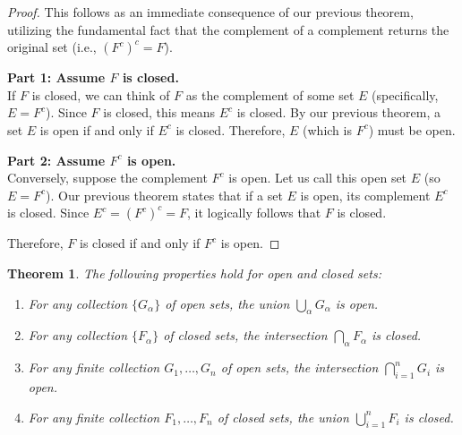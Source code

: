 \documentclass{article}
\theoremstyle{mythm}
\newtheorem{theorem}{Theorem}[section]
\begin{document}
\begin{proof}
This follows as an immediate consequence of our previous theorem, utilizing the fundamental fact that the complement of a complement returns the original set (i.e., $(F^c)^c = F$).

\textbf{Part 1: Assume $F$ is closed.} \\
If $F$ is closed, we can think of $F$ as the complement of some set $E$ (specifically, $E = F^c$). Since $F$ is closed, this means $E^c$ is closed. By our previous theorem, a set $E$ is open if and only if $E^c$ is closed. Therefore, $E$ (which is $F^c$) must be open.

\textbf{Part 2: Assume $F^c$ is open.} \\
Conversely, suppose the complement $F^c$ is open. Let us call this open set $E$ (so $E = F^c$). Our previous theorem states that if a set $E$ is open, its complement $E^c$ is closed. Since $E^c = (F^c)^c = F$, it logically follows that $F$ is closed.

Therefore, $F$ is closed if and only if $F^c$ is open.
\end{proof}
\begin{theorem}
The following properties hold for open and closed sets:
\begin{enumerate}[label=(\alph*)]
    \item For any collection $\{G_\alpha\}$ of open sets, the union $\bigcup_\alpha G_\alpha$ is open.
    \item For any collection $\{F_\alpha\}$ of closed sets, the intersection $\bigcap_\alpha F_\alpha$ is closed.
    \item For any finite collection $G_1, \dots, G_n$ of open sets, the intersection $\bigcap_{i=1}^n G_i$ is open.
    \item For any finite collection $F_1, \dots, F_n$ of closed sets, the union $\bigcup_{i=1}^n F_i$ is closed.
\end{enumerate}
\end{theorem}
\end{document}
